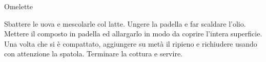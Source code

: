 \begin{recipe}[label=omelette]{Omelette}
    \begin{header}

    \end{header}

    \begin{ingredients}

        
    \end{ingredients}

    \begin{preparation}
        \step Sbattere le uova e mescolarle col latte.
        \step Ungere la padella e far scaldare l'olio.
        \step Mettere il composto in padella ed allargarlo in modo da coprire l'intera superficie.
        \step Una volta che si è compattato, aggiungere su metà il ripieno e richiudere usando con attenzione la spatola.
        \step Terminare la cottura e servire.
    \end{preparation}
\end{recipe}
